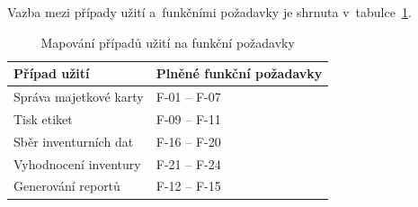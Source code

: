 \medskip

Vazba mezi případy užití a~funkčními požadavky je shrnuta v~tabulce~\ref{tab:uc-fr-mapping}.

\begin{table}[H]\centering
\renewcommand{\arraystretch}{1.3}
\caption{Mapování případů užití na funkční požadavky}\label{tab:uc-fr-mapping}
\begin{tabular}{l|l}
	\textbf{Případ užití} & \textbf{Plněné funkční požadavky} \tabularnewline \hline
	Správa majetkové karty & F-01 -- F-07 \tabularnewline
	Tisk etiket            & F-09 -- F-11 \tabularnewline
	Sběr inventurních dat  & F-16 -- F-20 \tabularnewline
	Vyhodnocení inventury  & F-21 -- F-24 \tabularnewline
	Generování reportů     & F-12 -- F-15 \tabularnewline
\end{tabular}
\end{table}



